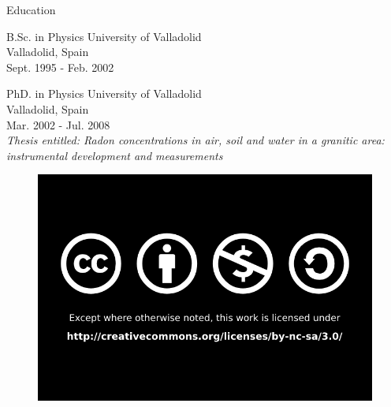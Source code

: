 \documentclass[newPxFont,numfooter,sectionpages]{beamer}
\newcommand{\1}{\'{\i}}
\begin{document}
\begingroup
{}

\begin{frame}{Education}

\begin{alertblock}{B.Sc. in Physics}
University of Valladolid \\     Valladolid, Spain \\     Sept. 1995 - Feb. 2002
\end{alertblock}

\begin{alertblock}{PhD. in Physics}
University of Valladolid \\     Valladolid, Spain \\     Mar. 2002 - Jul. 2008 \\ \emph{Thesis entitled: Radon concentrations in air, soil and water in a granitic area: instrumental development \- and measurements}
\end{alertblock}

\end{frame}


\endgroup



%
%
%
%

%
%
%
%

\begin{frame}

\begin{figure}

\href{http://creativecommons.org/licenses/by-nc-sa/4.0/}{\includegraphics[scale=0.4]{figures/By_nc_sa_bw.png}}

\end{figure}

\end{frame}
\end{document}
